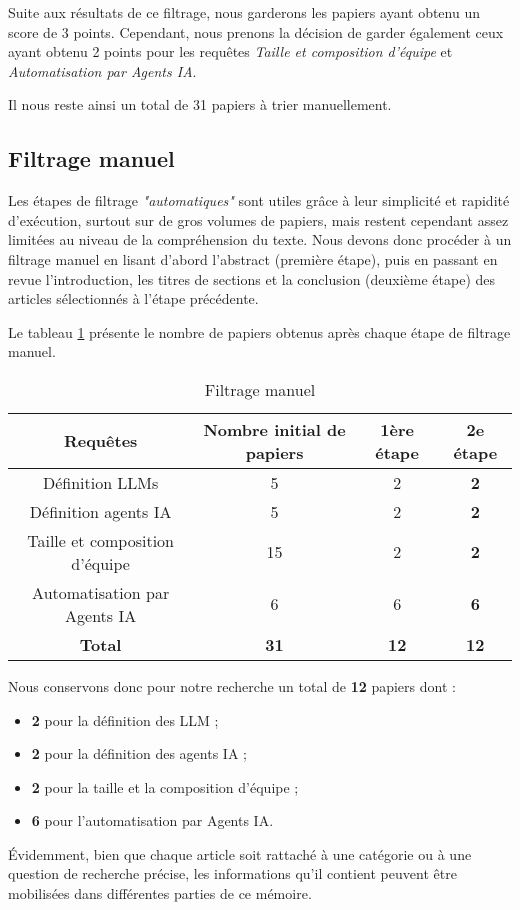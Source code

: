 Suite aux résultats de ce filtrage, nous garderons les papiers ayant obtenu un score de 3 points. Cependant, nous prenons la décision de garder également ceux ayant obtenu 2 points pour les requêtes \textit{Taille et composition d'équipe} et \textit{Automatisation par Agents IA}.

Il nous reste ainsi un total de 31 papiers à trier manuellement.

\subsection{Filtrage manuel}

Les étapes de filtrage \textit{"automatiques"} sont utiles grâce à leur simplicité et rapidité d'exécution, surtout sur de gros volumes de papiers, mais restent cependant assez limitées au niveau de la compréhension du texte. Nous devons donc procéder à un filtrage manuel en lisant d'abord l'abstract (première étape), puis en passant en revue l'introduction, les titres de sections et la conclusion (deuxième étape) des articles sélectionnés à l'étape précédente.

Le tableau \ref{filtrageManuel} présente le nombre de papiers obtenus après chaque étape de filtrage manuel.

\begin{table}[H]
\centering
\begin{tabular}{|c|c|c|c|}
    \hline
    \textbf{Requêtes} & \textbf{Nombre initial de papiers} & \textbf{1ère étape} & \textbf{2e étape} \\
    \hline
     Définition LLMs & 5 & 2 & \textbf{2}\\
     \hline
     Définition agents IA & 5 & 2 & \textbf{2}\\
     \hline
     Taille et composition d'équipe & 15 & 2 & \textbf{2}\\
    \hline
     Automatisation par Agents IA & 6 & 6 & \textbf{6}\\
     \hline
     \textbf{Total} & \textbf{31} & \textbf{12} & \textbf{12} \\
     \hline
\end{tabular}
\caption{Filtrage manuel}
\label{filtrageManuel}
\end{table}

Nous conservons donc pour notre recherche un total de \textbf{12} papiers dont :
\begin{itemize}
    \item \textbf{2} pour la définition des LLM ;
    \item \textbf{2} pour la définition des agents IA ;
    \item \textbf{2} pour la taille et la composition d’équipe ;
    \item \textbf{6} pour l’automatisation par Agents IA.
\end{itemize}
Évidemment, bien que chaque article soit rattaché à une catégorie ou à une question de recherche précise, les informations qu’il contient peuvent être mobilisées dans différentes parties de ce mémoire.